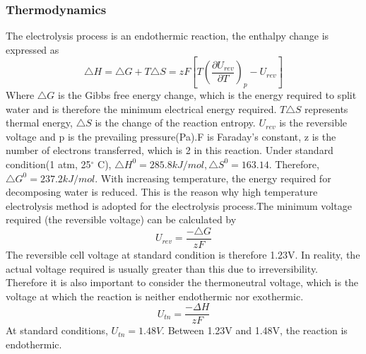 \subsubsection{Thermodynamics} 
The electrolysis process is an endothermic reaction, the enthalpy change is expressed as
\begin{equation} 
\triangle H =\triangle G + T\triangle S = zF[T(\frac{\partial U_{rev}}{\partial T})_p - U_{rev}]
\end{equation} 
Where $\triangle G $ is the Gibbs free energy change, which is the energy required to split water and is therefore the minimum electrical energy required. $T\triangle S$ represents thermal energy, $\triangle S$ is the change of the reaction entropy. $U_{rev}$ is the reversible voltage and p is the prevailing pressure(Pa).F is Faraday's constant, z is the number of electrons transferred, which is 2 in this reaction.\cite{gibbs}  
Under standard condition(1 atm, 25$^{\circ}$ C), $\triangle H^0 = 285.8 kJ/mol, \triangle S^0 = 163.14$. Therefore, $\triangle G^0 = 237.2 kJ/mol.$ With increasing temperature, the energy required for decomposing water is reduced. This is the reason why high temperature electrolysis method is adopted for the electrolysis process.The minimum voltage required (the reversible voltage) can be calculated by
\begin{equation} 
U_{rev} =\frac {-\triangle G} {zF} 
\end{equation} 
The reversible cell voltage at standard condition is therefore 1.23V. In reality, the actual voltage required is usually greater than this due to irreversibility. Therefore it is also important to consider the thermoneutral voltage, which is the voltage at which the reaction is neither endothermic nor exothermic. 
\begin{equation} 
U_{tn}=\frac{-\Delta H} {zF}
\end{equation} 
At standard conditions, $U_{tn} = 1.48V.$ Between 1.23V and 1.48V, the reaction is endothermic.\cite{thermoneutral} 

